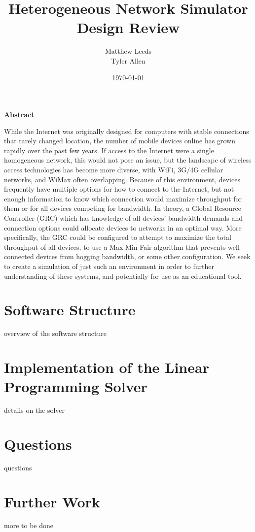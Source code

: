 \documentclass[11pt]{article}
\title{Heterogeneous Network Simulator Design Review}
\author{Matthew Leeds\\
	Tyler Allen\\}
\date{\today}
\begin{document}
\maketitle

\noindent \textbf{Abstract}

While the Internet was originally designed for computers with stable connections that rarely changed location, the number of mobile devices online has grown rapidly over the past few years. If access to the Internet were a single homogeneous network, this would not pose an issue, but the landscape of wireless access technologies has become more diverse, with WiFi, 3G/4G cellular networks, and WiMax often overlapping. Because of this environment, devices frequently have multiple options for how to connect to the Internet, but not enough information to know which connection would maximize throughput for them or for all devices competing for bandwidth. In theory, a Global Resource Controller (GRC) which has knowledge of all devices' bandwidth demands and connection options could allocate devices to networks in an optimal way. More specifically, the GRC could be configured to attempt to maximize the total throughput of all devices, to use a Max-Min Fair algorithm that prevents well-connected devices from hogging bandwidth, or some other configuration. We seek to create a simulation of just such an environment in order to further understanding of these systems, and potentially for use as an educational tool.

\section{Software Structure}

overview of the software structure

\section{Implementation of the Linear Programming Solver}

details on the solver

\section{Questions}

questions

\section{Further Work}

more to be done
\end{document}
